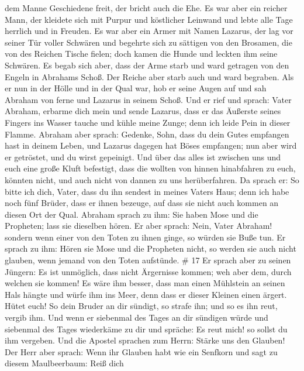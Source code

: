 dem Manne Geschiedene freit, der bricht auch die Ehe.  Es
war aber ein reicher Mann, der kleidete sich mit Purpur und köstlicher
Leinwand und lebte alle Tage herrlich und in Freuden.  Es
war aber ein Armer mit Namen Lazarus, der lag vor seiner Tür voller
Schwären  und begehrte sich zu sättigen von den Brosamen,
die von des Reichen Tische fielen; doch kamen die Hunde und leckten ihm
seine Schwären.  Es begab sich aber, dass der Arme starb
und ward getragen von den Engeln in Abrahams Schoß. Der Reiche aber
starb auch und ward begraben.  Als er nun in der Hölle und
in der Qual war, hob er seine Augen auf und sah Abraham von ferne und
Lazarus in seinem Schoß.  Und er rief und sprach: Vater
Abraham, erbarme dich mein und sende Lazarus, dass er das Äußerste
seines Fingers ins Wasser tauche und kühle meine Zunge; denn ich leide
Pein in dieser Flamme.  Abraham aber sprach: Gedenke, Sohn,
dass du dein Gutes empfangen hast in deinem Leben, und Lazarus dagegen
hat Böses empfangen; nun aber wird er getröstet, und du wirst gepeinigt.
 Und über das alles ist zwischen uns und euch eine große
Kluft befestigt, dass die wollten von hinnen hinabfahren zu euch,
könnten nicht, und auch nicht von dannen zu uns herüberfahren.
 Da sprach er: So bitte ich dich, Vater, dass du ihn
sendest in meines Vaters Haus;  denn ich habe noch fünf
Brüder, dass er ihnen bezeuge, auf dass sie nicht auch kommen an diesen
Ort der Qual.  Abraham sprach zu ihm: Sie haben Mose und
die Propheten; lass sie dieselben hören.  Er aber sprach:
Nein, Vater Abraham! sondern wenn einer von den Toten zu ihnen ginge, so
würden sie Buße tun.  Er sprach zu ihm: Hören sie Mose und
die Propheten nicht, so werden sie auch nicht glauben, wenn jemand von
den Toten aufstünde. \# 17  Er sprach aber zu seinen
Jüngern: Es ist unmöglich, dass nicht Ärgernisse kommen; weh aber dem,
durch welchen sie kommen!  Es wäre ihm besser, dass man
einen Mühlstein an seinen Hals hängte und würfe ihm ins Meer, denn dass
er dieser Kleinen einen ärgert.  Hütet euch! So dein Bruder
an dir sündigt, so strafe ihn; und so es ihn reut, vergib ihm.
 Und wenn er siebenmal des Tages an dir sündigen würde und
siebenmal des Tages wiederkäme zu dir und spräche: Es reut mich! so
sollst du ihm vergeben.  Und die Apostel sprachen zum Herrn:
Stärke uns den Glauben!  Der Herr aber sprach: Wenn ihr
Glauben habt wie ein Senfkorn und sagt zu diesem Maulbeerbaum: Reiß dich
